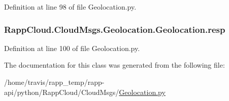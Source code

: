 Definition at line 98 of file Geolocation.\-py.

\hypertarget{classRappCloud_1_1CloudMsgs_1_1Geolocation_1_1Geolocation_ab18b064be105d6e18ccd4af9dd7d3195}{
\subsubsection[{resp}]{\setlength{\rightskip}{0pt plus 5cm}Rapp\-Cloud.\-Cloud\-Msgs.\-Geolocation.\-Geolocation.\-resp}}\label{classRappCloud_1_1CloudMsgs_1_1Geolocation_1_1Geolocation_ab18b064be105d6e18ccd4af9dd7d3195}


Definition at line 100 of file Geolocation.\-py.



The documentation for this class was generated from the following file\-:\begin{DoxyCompactItemize}
\item 
/home/travis/rapp\-\_\-temp/rapp-\/api/python/\-Rapp\-Cloud/\-Cloud\-Msgs/\hyperlink{Geolocation_8py}{Geolocation.\-py}\end{DoxyCompactItemize}

